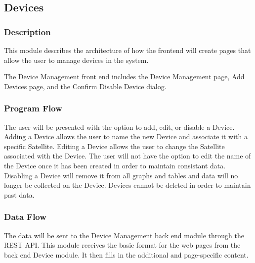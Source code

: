 
\subsection{Devices}

\subsubsection{Description}

This module describes the architecture of how the frontend will create pages that allow the user to manage devices in the system. 

The Device Management front end includes the Device Management page, Add Devices page, and the Confirm Disable Device dialog. 


\subsubsection{Program Flow}

The user will be presented with the option to add, edit, or disable a Device. 
Adding a Device allows the user to name the new Device and associate it with a specific Satellite. 
Editing a Device allows the user to change the Satellite associated with the Device. 
The user will not have the option to edit the name of the Device once it has been created in order to maintain consistant data. 
Disabling a Device will remove it from all graphs and tables and data will no longer be collected on the Device.
Devices cannot be deleted in order to maintain past data.

\subsubsection{Data Flow}

The data will be sent to the Device Management back end module through the REST API. 
This module receives the basic format for the web pages from the back end Device module. 
It then fills in the additional and page-specific content. 


